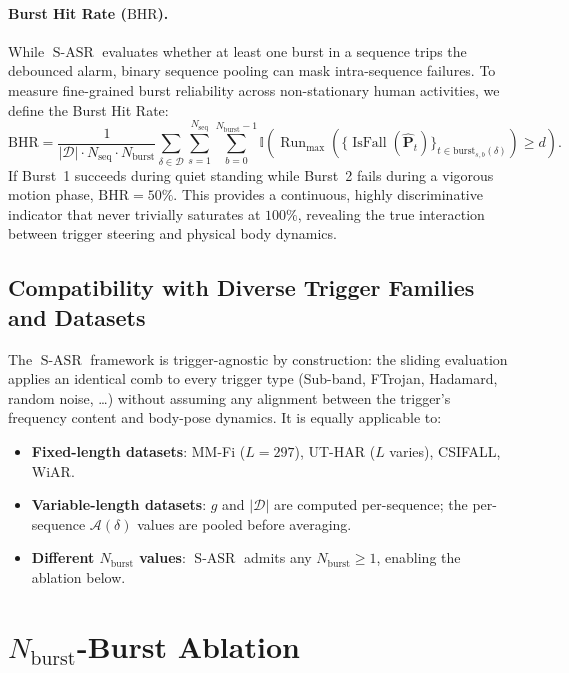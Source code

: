 \documentclass{article}
\newcommand{\IsFall}{\operatorname{IsFall}}
\newcommand{\SASR}{\operatorname{S-ASR}}
\newcommand{\Nb}{N_{\mathrm{burst}}}
\begin{document}
\paragraph{Burst Hit Rate ($\text{BHR}$).} While $\SASR$ evaluates whether at least one burst in a sequence trips the debounced alarm, binary sequence pooling can mask intra-sequence failures. To measure fine-grained burst reliability across non-stationary human activities, we define the Burst Hit Rate:
\begin{equation}
  \text{BHR} = \frac{1}{|\mathcal{D}| \cdot N_{\text{seq}} \cdot \Nb} \sum_{\delta \in \mathcal{D}} \sum_{s=1}^{N_{\text{seq}}} \sum_{b=0}^{\Nb-1} \mathbb{I}\!\left( \operatorname{Run}_{\max}\!\left( \{\IsFall(\hat{\mathbf{P}}_t)\}_{t \in \text{burst}_{s,b}(\delta)} \right) \ge d \right).
\end{equation}
If Burst~1 succeeds during quiet standing while Burst~2 fails during a vigorous motion phase, $\text{BHR} = 50\%$. This provides a continuous, highly discriminative indicator that never trivially saturates at $100\%$, revealing the true interaction between trigger steering and physical body dynamics.

\subsection{Compatibility with Diverse Trigger Families and Datasets}

The $\SASR$ framework is trigger-agnostic by construction: the sliding evaluation applies an
identical comb to every trigger type (Sub-band, FTrojan, Hadamard, random noise, \ldots) without
assuming any alignment between the trigger's frequency content and body-pose dynamics. It is
equally applicable to:
\begin{itemize}
  \item \textbf{Fixed-length datasets}: MM-Fi ($L=297$), UT-HAR ($L$ varies), CSIFALL, WiAR.
  \item \textbf{Variable-length datasets}: $g$ and $|\mathcal{D}|$ are computed per-sequence;
        the per-sequence $\mathcal{A}(\delta)$ values are pooled before averaging.
  \item \textbf{Different $\Nb$ values}: $\SASR$ admits any $\Nb \ge 1$, enabling the ablation
        below.
\end{itemize}

\section{$N_{\mathrm{burst}}$-Burst Ablation}
\end{document}

